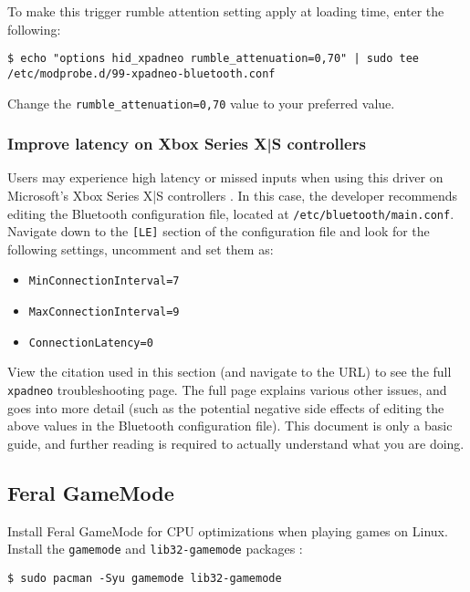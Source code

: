 \documentclass[a4paper]{article}
\begin{document}
To make this trigger rumble attention setting apply at loading time, enter the following: \cite{xpadneo-troubleshooting}

\begin{lstlisting}
$ echo "options hid_xpadneo rumble_attenuation=0,70" | sudo tee /etc/modprobe.d/99-xpadneo-bluetooth.conf
\end{lstlisting}
Change the \lstinline|rumble_attenuation=0,70| value to your preferred value.

\subsubsection{Improve latency on Xbox Series X|S controllers}

Users may experience high latency or missed inputs when using this driver on Microsoft's Xbox Series X|S controllers \cite{xpadneo-troubleshooting}. In this case, the developer recommends editing the Bluetooth configuration file, located at \lstinline|/etc/bluetooth/main.conf|. Navigate down to the \lstinline|[LE]| section of the configuration file and look for the following settings, uncomment and set them as:
\begin{itemize}
    \item \lstinline|MinConnectionInterval=7|
    \item \lstinline|MaxConnectionInterval=9|
    \item \lstinline|ConnectionLatency=0| \cite{xpadneo-troubleshooting}
\end{itemize}

\cite{xpadneo-troubleshooting} View the citation used in this section (and navigate to the URL) to see the full \lstinline|xpadneo| troubleshooting page.
The full page explains various other issues, and goes into more detail (such as the potential negative side effects of editing the above values in the Bluetooth configuration file).
This document is only a basic guide, and further reading is required to actually understand what you are doing.

\subsection{Feral GameMode}

Install Feral GameMode for CPU optimizations when playing games on Linux.
Install the \lstinline|gamemode| and \lstinline|lib32-gamemode| packages \cite{arch-wiki-gamemode}:

\begin{lstlisting}
$ sudo pacman -Syu gamemode lib32-gamemode
\end{lstlisting}
\end{document}
